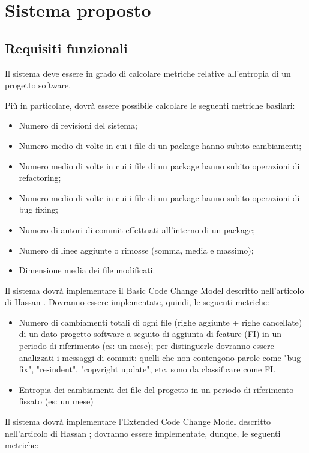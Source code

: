 \chapter{Sistema proposto}
\section{Requisiti funzionali}
Il sistema deve essere in grado di calcolare metriche relative all'entropia di un progetto software.

Più in particolare, dovrà essere possibile calcolare le seguenti metriche basilari:
\begin{itemize}
\item Numero di revisioni del sistema;
\item Numero medio di volte in cui i file di un package hanno subito
cambiamenti;
\item Numero medio di volte in cui i file di un package hanno subito operazioni
di refactoring;
\item Numero medio di volte in cui i file di un package hanno subito operazioni di
bug fixing;
\item Numero di autori di commit effettuati all’interno di un package;
\item Numero di linee aggiunte o rimosse (somma, media e massimo);
\item Dimensione media dei file modificati.
\end{itemize}

Il sistema dovrà implementare il Basic Code Change Model descritto nell'articolo di Hassan \cite{hassan2009predicting}. Dovranno essere implementate, quindi, le seguenti metriche:
\begin{itemize}
\item Numero di cambiamenti totali di ogni file (righe aggiunte + righe cancellate) di un dato progetto software a seguito di aggiunta di feature (FI) in un periodo di riferimento (es: un mese); per distinguerle dovranno essere analizzati i messaggi di commit: quelli che non contengono parole come "bug-fix", "re-indent", "copyright update", etc. sono da classificare come FI.
\item Entropia dei cambiamenti dei file del progetto in un periodo di riferimento fissato (es: un mese)
\end{itemize}

Il sistema dovrà implementare l'Extended Code Change Model descritto nell'articolo di Hassan \cite{hassan2009predicting}; dovranno essere implementate, dunque, le seguenti metriche:
